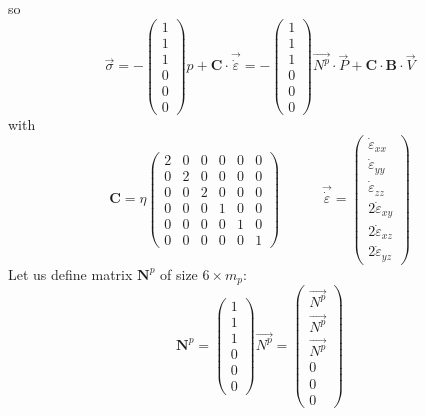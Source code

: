 so
\begin{equation}
\vec{\sigma} 
=-\left( 
\begin{array}{c}
1 \\ 1 \\ 1 \\ 0 \\ 0 \\ 0
\end{array}
\right) p+ {\bm C} \cdot \vec{\dot\varepsilon}
=
- \left(
\begin{array}{c}
1 \\ 1 \\ 1 \\ 0 \\ 0 \\ 0
\end{array}
\right)
\vec{N^p} \cdot {\vec P}  + 
{\bm C} \cdot  {\bm B}\cdot {\vec V}
\end{equation}
with
\begin{equation}
{\bm C}=
\eta
\left(
\begin{array}{cccccc}
2 & 0 & 0 & 0 & 0 & 0\\
0 & 2 & 0 & 0 & 0 & 0\\
0 & 0 & 2 & 0 & 0 & 0\\ 
0 & 0 & 0 & 1 & 0 & 0\\ 
0 & 0 & 0 & 0 & 1 & 0\\ 
0 & 0 & 0 & 0 & 0 & 1
\end{array}
\right)
\quad\quad\quad
\vec{\dot \varepsilon} = 
\left(
\begin{array}{c}
\dot \varepsilon_{xx} \\
\dot \varepsilon_{yy} \\
\dot \varepsilon_{zz} \\
2\dot \varepsilon_{xy}\\ 
2\dot \varepsilon_{xz} \\
2\dot \varepsilon_{yz} 
\end{array}
\right)
\end{equation}
Let us define matrix ${\bm N}^p$ of size $6\times m_p$:
\begin{equation}
{\bm N}^p=
\left(
\begin{array}{c}
1 \\ 1 \\ 1 \\ 0 \\ 0 \\ 0
\end{array}
\right)
\vec{N^p} 
=
\left(
\begin{array}{c}
\vec{N^p} \\
\vec{N^p} \\
\vec{N^p} \\
0 \\
0 \\
0
\end{array}
\right)
\end{equation}
